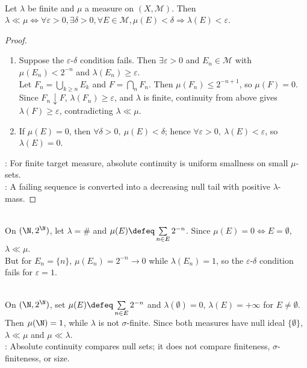 \begin{lemma} \label{lem:absolute-continuity-epsilon-delta-finite-source} \\
Let $\lambda$ be finite and $\mu$ a measure on $(X,\mathcal{M})$. Then $\lambda\ll\mu\Leftrightarrow\forall\varepsilon>0,\exists\delta>0,\forall E\in\mathcal{M},\mu(E)<\delta\Rightarrow\lambda(E)<\varepsilon$.
\begin{proof}
\begin{enumerate}[label=\roman*.]
\setlength{\itemsep}{0pt}
\item[$(\Rightarrow)$] Suppose the $\varepsilon$-$\delta$ condition fails. Then $\exists\varepsilon>0$ and $E_n\in\mathcal{M}$ with $\mu(E_n)<2^{-n}$ and $\lambda(E_n)\geq\varepsilon$.\\
Let $F_n=\bigcup\limits_{k\geq n}E_k$ and $F=\bigcap\limits_nF_n$. Then $\mu(F_n)\leq2^{-n+1}$, so $\mu(F)=0$.\\
Since $F_n\downarrow F$, $\lambda(F_n)\geq\varepsilon$, and $\lambda$ is finite, continuity from above gives $\lambda(F)\geq\varepsilon$, contradicting $\lambda\ll\mu$.
\item[$(\Leftarrow)$] If $\mu(E)=0$, then $\forall\delta>0,\ \mu(E)<\delta$; hence $\forall\varepsilon>0,\ \lambda(E)<\varepsilon$, so $\lambda(E)=0$.
\end{enumerate}
: For finite target measure, absolute continuity is uniform smallness on small $\mu$-sets.\\
: A failing sequence is converted into a decreasing null tail with positive $\lambda$-mass.
\end{proof}
\end{lemma}

\begin{example} \label{ex:absolute-continuity-delta-fails-infinite-target} \\
On $(\N,2^\N)$, let $\lambda=\#$ and $\mu(E)\defeq\sum\limits_{n\in E}2^{-n}$. Since $\mu(E)=0\Leftrightarrow E=\emptyset$, $\lambda\ll\mu$.\\
But for $E_n=\{n\}$, $\mu(E_n)=2^{-n}\to0$ while $\lambda(E_n)=1$, so the $\varepsilon$-$\delta$ condition fails for $\varepsilon=1$.
\end{example}

\begin{example} \label{ex:mutual-absolute-continuity-with-infinite-measure} \\
On $(\N,2^\N)$, set $\mu(E)\defeq\sum\limits_{n\in E}2^{-n}$ and $\lambda(\emptyset)=0$, $\lambda(E)=+\infty$ for $E\neq\emptyset$.\\
Then $\mu(\N)=1$, while $\lambda$ is not $\sigma$-finite. Since both measures have null ideal $\{\emptyset\}$, $\lambda\ll\mu$ and $\mu\ll\lambda$.\\
: Absolute continuity compares null sets; it does not compare finiteness, $\sigma$-finiteness, or size.
\end{example}
